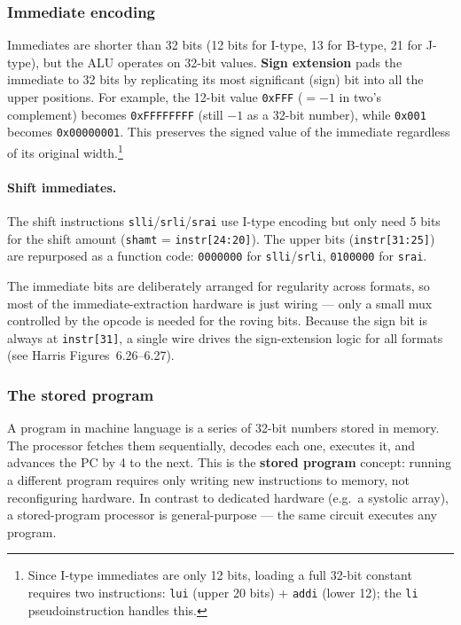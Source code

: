 \documentclass[9pt, a4paper]{extarticle}
\begin{document}
\subsubsection{Immediate encoding}

Immediates are shorter than 32 bits (12 bits for I-type, 13 for B-type, 21 for J-type), but the ALU operates on 32-bit values. \textbf{Sign extension} pads the immediate to 32 bits by replicating its most significant (sign) bit into all the upper positions. For example, the 12-bit value \texttt{0xFFF} ($= -1$ in two's complement) becomes \texttt{0xFFFFFFFF} (still $-1$ as a 32-bit number), while \texttt{0x001} becomes \texttt{0x00000001}. This preserves the signed value of the immediate regardless of its original width.\footnote{Since I-type immediates are only 12 bits, loading a full 32-bit constant requires two instructions: \texttt{lui} (upper 20 bits) + \texttt{addi} (lower 12); the \texttt{li} pseudoinstruction handles this.}

\paragraph{Shift immediates.} The shift instructions \texttt{slli}/\texttt{srli}/\texttt{srai} use I-type encoding but only need 5 bits for the shift amount (\texttt{shamt} = \texttt{instr[24:20]}). The upper bits (\texttt{instr[31:25]}) are repurposed as a function code: \texttt{0000000} for \texttt{slli}/\texttt{srli}, \texttt{0100000} for \texttt{srai}.

The immediate bits are deliberately arranged for regularity across formats, so most of the immediate-extraction hardware is just wiring --- only a small mux controlled by the opcode is needed for the roving bits. Because the sign bit is always at \texttt{instr[31]}, a single wire drives the sign-extension logic for all formats (see Harris Figures~6.26--6.27).

\subsubsection{The stored program}

A program in machine language is a series of 32-bit numbers stored in memory. The processor fetches them sequentially, decodes each one, executes it, and advances the PC by 4 to the next. This is the \textbf{stored program} concept: running a different program requires only writing new instructions to memory, not reconfiguring hardware. In contrast to dedicated hardware (e.g.\ a systolic array), a stored-program processor is general-purpose --- the same circuit executes any program.
\end{document}
